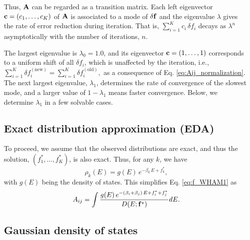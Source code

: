 \documentclass[reprint,aip,jcp,superscriptaddress]{revtex4-1}
\begin{document}
Thus,
$\mathbf{A}$
can be regarded as a transition matrix\cite{
newman}.
%
Each left eigenvector
$\mathbf{c} = (c_1, \dots, c_K)$
of $\mathbf{A}$
is associated to a mode of $\delta \mathbf{f}$
and the eigenvalue $\lambda$
gives the rate of error reduction
during iteration.
%
That is,
$\sum_{i = 1}^K c_i \, \delta f_i$
decays as $\lambda^n$
asymptotically
with the number of iterations, $n$.




The largest eigenvalue is $\lambda_0 = 1.0$,
and its eigenvector
$\mathbf{c} = (1, \dots, 1)$
corresponds to a uniform shift of all
$\delta f_i$,
which is unaffected by the iteration,
%
i.e.,
$
\sum_{i=1}^K \delta f_i^\mathrm{(new)}
=
\sum_{i=1}^K \delta f_i^\mathrm{(old)},
$
as a consequence of
Eq. \eqref{eq:Aij_normalization}.
%
The next largest eigenvalue,
$\lambda_1$,
determines the rate of convergence
of the slowest mode,
%
and a larger value of
$1 - \lambda_1$
means faster convergence.
%
Below,
we determine $\lambda_1$
in a few solvable cases.



\subsection{Exact distribution approximation (EDA)}



To proceed, we assume that
the observed distributions are exact,
%
and thus the solution,
$(f_1^*, \dots, f_K^*)$,
is also exact.
%
Thus, for any $k$, we have
%
\begin{equation}
\rho_k(E)
=
g(E) \,
e^{-\beta_k \, E + f_k^*},
\label{eq:rho_EDA}
\end{equation}
%
with $g(E)$ being the density of states.
%
%
This simplifies Eq. \eqref{eq:f_WHAM1} as
%
\begin{align}
A_{ij}
=
\int
\frac
{
  g(E) \, e^{ -(\beta_i + \beta_j) \, E + f_i^* + f_j^*}
}
{
  D(E; \mathbf{f}^*)
}
dE.
\label{eq:Aij_EDA}
\end{align}




\subsection{Gaussian density of states}
\end{document}
